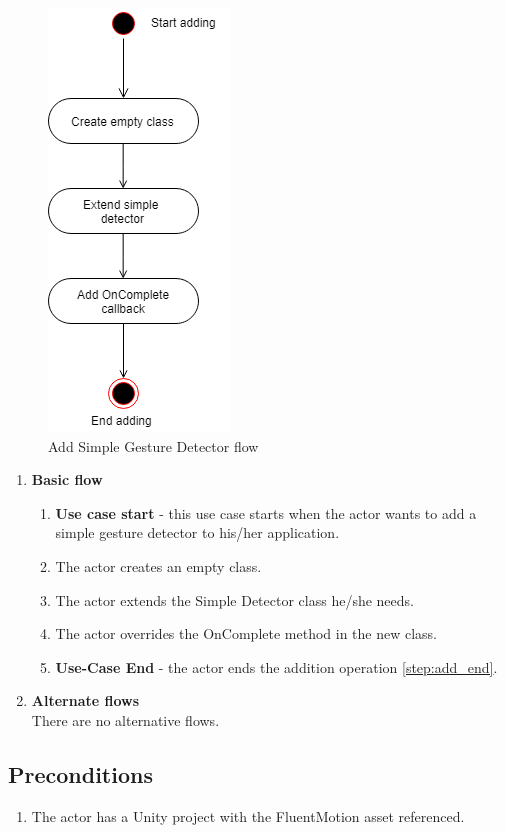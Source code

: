 \documentclass[12pt,a4paper,twoside]{report}
\begin{document}
\begin{figure}[h]
  \centering
  \includegraphics[width=0.3\linewidth]{img/UC_simple_gesture.png}
  \caption{Add Simple Gesture Detector flow}
  \label{fig:uc_simple}
\end{figure}


\begin{enumerate}
  \item \textbf{Basic flow}
    \begin{enumerate}
      \item \textbf{Use case start} - this use case starts when the actor wants to add a simple gesture detector to his/her application.
      \item The actor creates an empty class.
      \item The actor extends the Simple Detector class he/she needs.
      \item The actor overrides the OnComplete method in the new class.
      \item \label{step:add_end} \textbf{Use-Case End} - the actor ends the addition operation \ref{step:add_end}.
    \end{enumerate}
  \item \textbf{Alternate flows} \\
    There are no alternative flows.
\end{enumerate}

\subsection{Preconditions}

\begin{enumerate}
  \item The actor has a Unity project with the FluentMotion asset referenced.
\end{enumerate}
\end{document}
